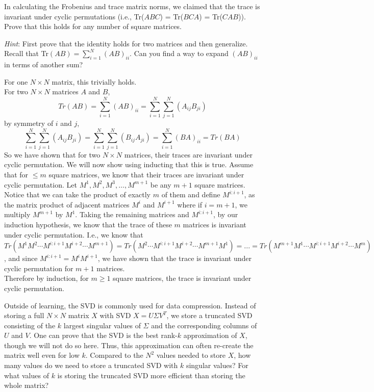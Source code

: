 \problem[5] In calculating the Frobenius and trace matrix norms, we claimed that the trace is invariant under cyclic permutations (i.e., Tr($ABC$) = Tr($BCA$) = Tr($CAB$)). Prove that this holds for any number of square matrices.

\textit{Hint}: First prove that the identity holds for two matrices and then generalize. Recall that Tr$(AB) = \sum_{i=1}^{N}(AB)_{ii}$. Can you find a way to expand $(AB)_{ii}$ in terms of another sum?

\begin{solution}
	For one $N \times N$ matrix, this trivially holds. \\
	For two $N \times N$ matrices $A$ and $B$, 
	$$Tr(AB) = \sum_{i=1}^{N}(AB)_{ii} = \sum_{i=1}^N\sum_{j=1}^N(A_{ij}B_{ji})$$
	by symmetry of $i$ and $j$,
	$$\sum_{i=1}^N\sum_{j=1}^N(A_{ij}B_{ji}) = \sum_{i=1}^N\sum_{j=1}^N(B_{ij}A_{ji}) = \sum_{i=1}^N(BA)_{ii} = Tr(BA)$$
	So we have shown that for two $N \times N$ matrices, their traces are invariant under cyclic permutation. We will now show using inducting that this is true.
	Assume that for $ \leq m$ square matrices, we know that their traces are invariant under cyclic permutation. Let $M^1, M^2, M^3, \dots, M^{m+1}$ be any $m + 1$ square matrices. Notice that we can take the product of exactly $m$ of them and define $M^{i:i+1}$, as the matrix product of adjacent matrices $M^i$ and $M^{i+1}$ where if $i = m + 1$, we multiply $M^{m+1}$ by $M^1$. Taking the remaining matrices and $M^{i:i+1}$, by our induction hypothesis, we know that the trace of these $m$ matrices is invariant under cyclic permutation. I.e., we know that $Tr(M^1 M^2 \cdots M^{i:i+1} M^{i+2} \cdots M^{m+1}) = Tr(M^2 \cdots M^{i:i+1} M^{i+2} \cdots M^{m+1} M^1) = ... = Tr(M^{m+1} M^1 \cdots M^{i:i+1} M^{i+2} \cdots M^m)$, and since $M^{i:i+1} = M^i M^{i+1}$, we have shown that the trace is invariant under cyclic permutation for $m+1$ matrices. \\
	Therefore by induction, for $m \geq 1$ square matrices, the trace is invariant under cyclic permutation.
\end{solution}

\problem[3] Outside of learning, the SVD is commonly used for data compression. Instead of storing a full $N \times N$ matrix $X$ with SVD $X = U\Sigma V^T$, we store a truncated SVD consisting of the $k$ largest singular values of $\Sigma$ and the corresponding columns of $U$ and $V$. One can prove that the SVD is the best rank-$k$ approximation of $X$, though we will not do so here. Thus, this approximation can often re-create the matrix well even for low $k$. Compared to the $N^2$ values needed to store $X$, how many values do we need to store a truncated SVD with $k$ singular values? For what values of $k$ is storing the truncated SVD more efficient than storing the whole matrix?

